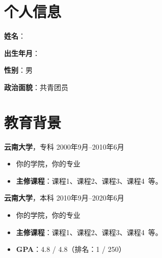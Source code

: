 \documentclass[11pt]{article}
\newlength{\iconwidth}
\begin{document}
    \begin{minipage}[t]{0.78\textwidth}
        \begin{minipage}[t]{\textwidth}
        \section[个人信息]{\makebox[\iconwidth][c]{\color{primary_color}{\faAddressCard}}\quad 个人信息}
        \begin{minipage}[t]{0.5\textwidth}
            \textbf{姓\qquad 名}：
            
            \vspace{0.5em}
            \textbf{出生年月}：
        \end{minipage}
        \begin{minipage}[t]{0.35\textwidth}
            \textbf{性\qquad 别}：男
            
            \vspace{0.5em}
            \textbf{政治面貌}：共青团员
        \end{minipage}
        \vspace{1.2em}
        \end{minipage}

        \begin{minipage}[t]{\textwidth}
        \section[教育背景]{\makebox[\iconwidth][c]{\color{primary_color}{\faGraduationCap}}\quad 教育背景}
        
        {\large \textbf{云南大学}}，专科 \hfill 2000年9月--2010年6月
        \begin{itemize}
            \item 你的学院，你的专业
            \item \textbf{主修课程}：课程1、课程2、课程3、课程4\ 等。
        \end{itemize}
        
        \vspace{0.5em}
        {\large \textbf{云南大学}}，本科 \hfill 2010年9月--2020年6月
        \begin{itemize}
            \item 你的学院，你的专业
            \item \textbf{主修课程}：课程1、课程2、课程3、课程4\ 等。
            \item \textbf{GPA}：4.8 / 4.8（排名：1 / 250）
        \end{itemize}
        

\end{minipage}
\end{minipage}
\end{document}
